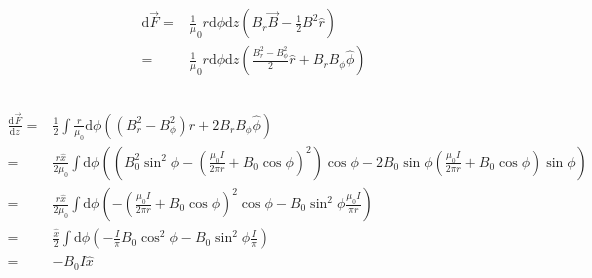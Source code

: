\documentclass[10pt,fleqn]{article}
\newcommand{\ud}{\mathrm{d}}
\newcommand{\eqar}[1]
{
  \begin{align*}
    #1
  \end{align*}
}
\newcommand{\paren}[1]{{\left({#1}\right)}}
\newcommand{\diff}[3][{}]{{\frac{\ud^{#1} {#2}}{\ud {#3}{}^{#1}}}}
\begin{document}
\subsection{}
\eqar{
  \ud\vec F=&\frac1\mu_0r\ud\phi\ud z\paren{B_r\vec B-\frac{1}{2}B^2\hat r}\\
  =&\frac1\mu_0r\ud\phi\ud z\paren{\frac{B_r^2-B_\phi^2}2\hat r+B_rB_\phi\hat\phi}
}
\subsection{}
\eqar{
  \diff{\vec F}{z}=&\frac12\int\frac{r}{\mu_0}\ud\phi\paren{\paren{B_r^2-B_\phi^2}\hat r+2B_rB_\phi\hat\phi}\\
  =&\frac{r\hat x}{2\mu_0}\int\ud\phi\paren{\paren{B_0^2\sin^2\phi-\paren{\frac{\mu_0 I}{2\pi r}+B_0\cos\phi}^2}\cos\phi-2B_0\sin\phi\paren{\frac{\mu_0 I}{2\pi r}+B_0\cos\phi}\sin\phi}\\
  =&\frac{r\hat x}{2\mu_0}\int\ud\phi\paren{-\paren{\frac{\mu_0 I}{2\pi r}+B_0\cos\phi}^2\cos\phi-B_0\sin^2\phi\frac{\mu_0 I}{\pi r}}\\
  =&\frac{\hat x}{2}\int\ud\phi\paren{-\frac{I}{\pi}B_0\cos^2\phi-B_0\sin^2\phi\frac{I}{\pi}}\\
  =&-B_0I\hat x\\
}
\end{document}
